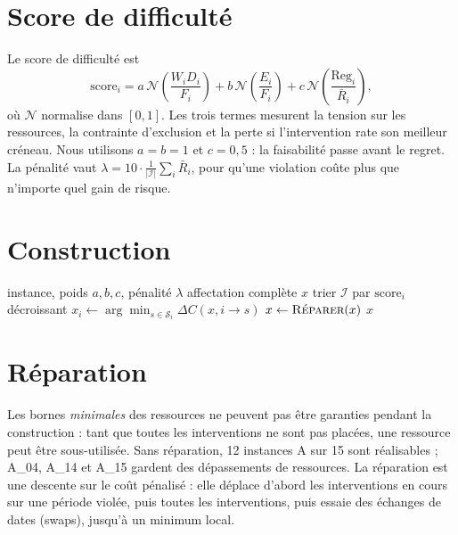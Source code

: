 \documentclass[11pt,a4paper]{report}
\newcommand{\I}{\mathcal{I}}
\newcommand{\Sd}{\mathcal{S}}
\begin{document}
\section{Score de difficulté}

Le score de difficulté est
\[
  \mathrm{score}_i = a \, \mathcal{N}\!\left(\frac{W_i D_i}{F_i}\right)
                   + b \, \mathcal{N}\!\left(\frac{E_i}{F_i}\right)
                   + c \, \mathcal{N}\!\left(\frac{\mathrm{Reg}_i}{\bar R_i}\right),
\]
où $\mathcal{N}$ normalise dans $[0, 1]$. Les trois termes mesurent la tension sur les ressources,
la contrainte d'exclusion et la perte si l'intervention rate son meilleur créneau. Nous utilisons
$a = b = 1$ et $c = 0{,}5$ : la faisabilité passe avant le regret. La pénalité vaut
$\lambda = 10 \cdot \frac{1}{|\I|} \sum_i \bar R_i$, pour qu'une violation coûte plus que n'importe
quel gain de risque.

\section{Construction}

\begin{algorithm}[H]
\caption{\textsc{Glouton}}
\begin{algorithmic}[1]
\Require instance, poids $a, b, c$, pénalité $\lambda$
\Ensure affectation complète $x$
\State trier $\I$ par $\mathrm{score}_i$ décroissant
  \State $x_i \gets \arg\min_{s \in \Sd_i} \Delta C(x, i \to s)$ 
\EndFor
{} \State $x \gets \textsc{Réparer}(x)$ \EndIf
\State \Return $x$
\end{algorithmic}
\end{algorithm}

\section{Réparation}

Les bornes \emph{minimales} des ressources ne peuvent pas être garanties pendant la construction :
tant que toutes les interventions ne sont pas placées, une ressource peut être sous-utilisée. Sans
réparation, 12 instances A sur 15 sont réalisables ; A\_04, A\_14 et A\_15 gardent des dépassements
de ressources. La réparation est une descente sur le coût pénalisé : elle déplace d'abord les
interventions en cours sur une période violée, puis toutes les interventions, puis essaie des
échanges de dates (swaps), jusqu'à un minimum local.
\end{document}
